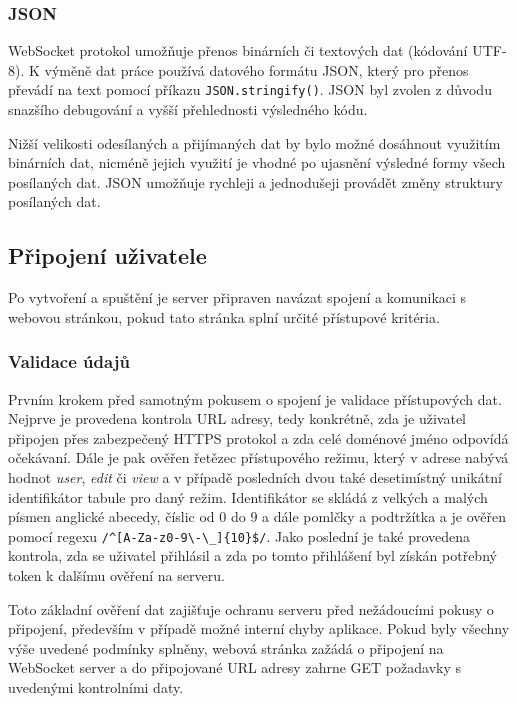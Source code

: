 \subsubsection{JSON}
\begin{sloppypar*}
WebSocket protokol umožňuje přenos binárních či textových dat (kódování UTF-8). \cite{web:IETF/rfc6455}
K výměně dat práce používá datového formátu JSON, který pro přenos převádí na text pomocí příkazu \texttt{JSON.stringify()}.
JSON byl zvolen z důvodu snazšího debugování a vyšší přehlednosti výsledného kódu.
\end{sloppypar*}
Nižší velikosti odesílaných a přijímaných dat by bylo možné dosáhnout využitím binárních dat, nicméně jejich využití je vhodné po ujasnění výsledné formy všech posílaných dat.
JSON umožňuje rychleji a jednodušeji provádět změny struktury posílaných dat.



\subsection{Připojení uživatele}
Po vytvoření a spuštění je server připraven navázat spojení a komunikaci s webovou stránkou, pokud tato stránka splní určité přístupové kritéria.


\subsubsection{Validace údajů}
\begin{sloppypar*}
Prvním krokem před samotným pokusem o spojení je validace přístupových dat.
Nejprve je provedena kontrola URL adresy, tedy konkrétně, zda je uživatel připojen přes zabezpečený HTTPS protokol a zda celé doménové jméno odpovídá očekávaní.
Dále je pak ověřen řetězec přístupového režimu, který v adrese nabývá hodnot \textit{user}, \textit{edit} či \textit{view} a v případě posledních dvou také desetimístný unikátní identifikátor tabule pro daný režim.
Identifikátor se skládá z velkých a malých písmen anglické abecedy, číslic od 0 do 9 a dále pomlčky a podtržítka a je ověřen pomocí regexu \texttt{/\textasciicircum[A-Za-z0-9\textbackslash-\textbackslash\_]\{10\}\$/}.
Jako poslední je také provedena kontrola, zda se uživatel přihlásil a zda po tomto přihlášení byl získán potřebný token k dalšímu ověření na serveru.
\end{sloppypar*}
Toto základní ověření dat zajišťuje ochranu serveru před nežádoucími pokusy o připojení, především v případě možné interní chyby aplikace.
Pokud byly všechny výše uvedené podmínky splněny, webová stránka zažádá o připojení na WebSocket server a do připojované URL adresy zahrne GET požadavky s uvedenými kontrolními daty.

